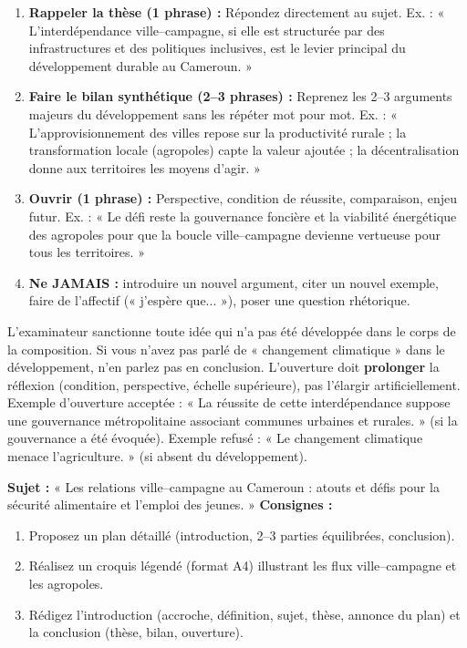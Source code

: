 \documentclass[11pt]{article}
\begin{document}
\begin{methode}
\begin{enumerate}
\item \textbf{Rappeler la thèse (1 phrase) :} Répondez directement au sujet. Ex. : « L'interdépendance ville–campagne, si elle est structurée par des infrastructures et des politiques inclusives, est le levier principal du développement durable au Cameroun. »
\item \textbf{Faire le bilan synthétique (2–3 phrases) :} Reprenez les 2–3 arguments majeurs du développement sans les répéter mot pour mot. Ex. : « L'approvisionnement des villes repose sur la productivité rurale ; la transformation locale (agropoles) capte la valeur ajoutée ; la décentralisation donne aux territoires les moyens d'agir. »
\item \textbf{Ouvrir (1 phrase) :} Perspective, condition de réussite, comparaison, enjeu futur. Ex. : « Le défi reste la gouvernance foncière et la viabilité énergétique des agropoles pour que la boucle ville–campagne devienne vertueuse pour tous les territoires. »
\item \textbf{Ne JAMAIS :} introduire un nouvel argument, citer un nouvel exemple, faire de l'affectif (« j'espère que... »), poser une question rhétorique.
\end{enumerate}
\end{methode}

\begin{attention}
L'examinateur sanctionne toute idée qui n'a pas été développée dans le corps de la composition. Si vous n'avez pas parlé de « changement climatique » dans le développement, n'en parlez pas en conclusion. L'ouverture doit \textbf{prolonger} la réflexion (condition, perspective, échelle supérieure), pas l'élargir artificiellement. Exemple d'ouverture acceptée : « La réussite de cette interdépendance suppose une gouvernance métropolitaine associant communes urbaines et rurales. » (si la gouvernance a été évoquée). Exemple refusé : « Le changement climatique menace l'agriculture. » (si absent du développement).
\end{attention}

\begin{exercice}
\textbf{Sujet :} « Les relations ville–campagne au Cameroun : atouts et défis pour la sécurité alimentaire et l'emploi des jeunes. »
\textbf{Consignes :} 
\begin{enumerate}
\item Proposez un plan détaillé (introduction, 2–3 parties équilibrées, conclusion).
\item Réalisez un croquis légendé (format A4) illustrant les flux ville–campagne et les agropoles.
\item Rédigez l'introduction (accroche, définition, sujet, thèse, annonce du plan) et la conclusion (thèse, bilan, ouverture).
\end{enumerate}
\end{exercice}
\end{document}
